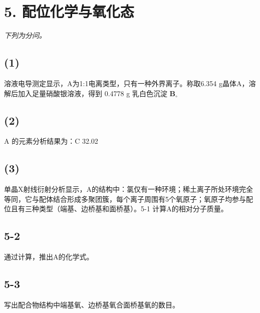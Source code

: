 \section*{5. 配位化学与氧化态}
\textit{下列为分问。}

\subsection*{(1)}
溶液电导测定显⽰，A为1:1电离类型，只有⼀种外界离⼦。称取6.354 g晶体A，溶解后加⼊⾜量硝酸银溶液，得到 0.4778 g 乳⽩⾊沉淀 $\mathbf { B } _ { \circ }$

\subsection*{(2)}
A 的元素分析结果为：C 32.02%

\subsection*{(3)}
单晶X射线衍射分析显⽰，A的结构中：氯仅有⼀种环境；稀⼟离⼦所处环境完全等同，它与配体结合形成多聚团簇，每个离⼦周围有5个氧原⼦；氧原⼦均参与配位且有三种类型（端基、边桥基和⾯桥基）。5-1 计算A的相对分⼦质量。

\subsection*{5-2}
通过计算，推出A的化学式。

\subsection*{5-3}
写出配合物结构中端基氧、边桥基氧合⾯桥基氧的数⽬。
